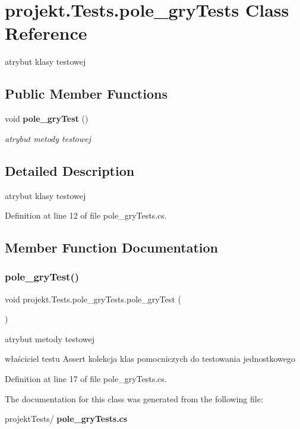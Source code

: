 \section{projekt.\+Tests.\+pole\+\_\+gry\+Tests Class Reference}
\label{classprojekt_1_1Tests_1_1pole__gryTests}


atrybut klasy testowej  


\subsection*{Public Member Functions}
\begin{DoxyCompactItemize}
\item 
void \textbf{ pole\+\_\+gry\+Test} ()
\begin{DoxyCompactList}\small\item\em atrybut metody testowej \end{DoxyCompactList}\end{DoxyCompactItemize}


\subsection{Detailed Description}
atrybut klasy testowej 

Definition at line 12 of file pole\+\_\+gry\+Tests.\+cs.



\subsection{Member Function Documentation}
\mbox{\label{classprojekt_1_1Tests_1_1pole__gryTests_a5e2724c36fd3b28d160ff4d0b587f737}} 
\subsubsection{pole\+\_\+gry\+Test()}
{\footnotesize\ttfamily void projekt.\+Tests.\+pole\+\_\+gry\+Tests.\+pole\+\_\+gry\+Test (\begin{DoxyParamCaption}{ }\end{DoxyParamCaption})\hspace{0.3cm}{\ttfamily [inline]}}



atrybut metody testowej 

właściciel testu Assert kolekcja klas pomocniczych do testowania jednostkowego 

Definition at line 17 of file pole\+\_\+gry\+Tests.\+cs.



The documentation for this class was generated from the following file\+:\begin{DoxyCompactItemize}
\item 
projekt\+Tests/\textbf{ pole\+\_\+gry\+Tests.\+cs}\end{DoxyCompactItemize}
